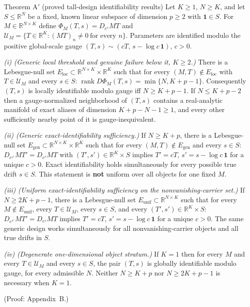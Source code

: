 \begin{namedthm}{Theorem A$'$ (proved tall-design identifiability results)}
Let $K\ge1$, $N\ge K$, and let $S\le\mathbb R^N$ be a fixed, known linear subspace of dimension $p\ge2$ with $\mathbf 1\in S$. For $M\in\mathbb R^{N\times K}$ define $\Phi_M(T,s)=D_{e^{s}}MT$ and $\mathcal U_M=\{T\in\mathbb R^K:(MT)_n\neq0\ \text{for every } n\}$. Parameters are identified modulo the positive global-scale gauge $(T,s)\sim(cT,\,s-\log c\,\mathbf 1)$, $c>0$.

\emph{(i) (Generic local threshold and genuine failure below it, $K\ge2$.)} There is a Lebesgue-null set $E_{\mathrm{loc}}\subset\mathbb R^{N\times K}\times\mathbb R^K$ such that for every $(M,T)\notin E_{\mathrm{loc}}$ with $T\in\mathcal U_M$ and every $s\in S$: $\operatorname{rank}D\Phi_M(T,s)=\min\{N,K+p-1\}$. Consequently $(T,s)$ is locally identifiable modulo gauge iff $N\ge K+p-1$. If $N\le K+p-2$ then a gauge-normalized neighborhood of $(T,s)$ contains a real-analytic manifold of exact aliases of dimension $K+p-N-1\ge1$, and every other sufficiently nearby point of it is gauge-inequivalent.

\emph{(ii) (Generic exact-identifiability sufficiency.)} If $N\ge K+p$, there is a Lebesgue-null set $E_{\mathrm{gen}}\subset\mathbb R^{N\times K}\times\mathbb R^K$ such that for every $(M,T)\notin E_{\mathrm{gen}}$ and every $s\in S$: $D_{e^{s'}}MT'=D_{e^{s}}MT$ with $(T',s')\in\mathbb R^K\times S$ implies $T'=cT$, $s'=s-\log c\,\mathbf 1$ for a unique $c>0$. Exact identifiability holds simultaneously for every possible true drift $s\in S$. This statement is \textbf{not} uniform over all objects for one fixed $M$.

\emph{(iii) (Uniform exact-identifiability sufficiency on the nonvanishing-carrier set.)} If $N\ge2K+p-1$, there is a Lebesgue-null set $E_{\mathrm{unif}}\subset\mathbb R^{N\times K}$ such that for every $M\notin E_{\mathrm{unif}}$, every $T\in\mathcal U_M$, every $s\in S$, and every $(T',s')\in\mathbb R^K\times S$: $D_{e^{s'}}MT'=D_{e^{s}}MT$ implies $T'=cT$, $s'=s-\log c\,\mathbf 1$ for a unique $c>0$. The same generic design works simultaneously for all nonvanishing-carrier objects and all true drifts in $S$.

\emph{(iv) (Degenerate one-dimensional object stratum.)} If $K=1$ then for every $M$ and every $T\in\mathcal U_M$ and every $s\in S$, the pair $(T,s)$ is globally identifiable modulo gauge, for every admissible $N$. Neither $N\ge K+p$ nor $N\ge2K+p-1$ is necessary when $K=1$.

(Proof: Appendix~B.)
\end{namedthm}

